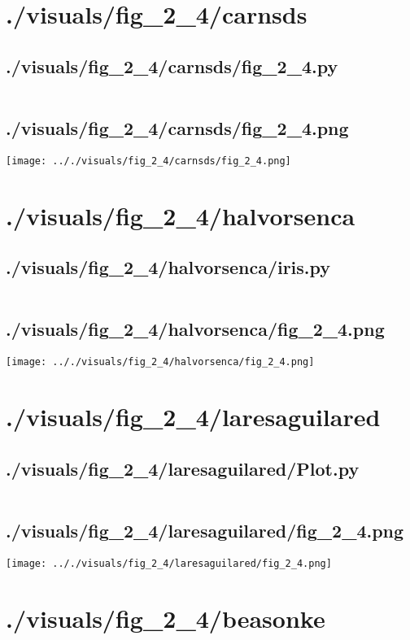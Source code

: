 \documentclass{report}
\begin{document}
    \section{./visuals/fig\_2\_4/carnsds}
    \subsection{./visuals/fig\_2\_4/carnsds/fig\_2\_4.py}
    \inputminted[breaklines=true]{python}{.././visuals/fig_2_4/carnsds/fig_2_4.py}
    \subsection{./visuals/fig\_2\_4/carnsds/fig\_2\_4.png}
    \texttt{[image: .././visuals/fig\_2\_4/carnsds/fig\_2\_4.png]}
    \pagebreak
    \section{./visuals/fig\_2\_4/halvorsenca}
    \subsection{./visuals/fig\_2\_4/halvorsenca/iris.py}
    \inputminted[breaklines=true]{python}{.././visuals/fig_2_4/halvorsenca/iris.py}
    \subsection{./visuals/fig\_2\_4/halvorsenca/fig\_2\_4.png}
    \texttt{[image: .././visuals/fig\_2\_4/halvorsenca/fig\_2\_4.png]}
    \pagebreak
    \section{./visuals/fig\_2\_4/laresaguilared}
    \subsection{./visuals/fig\_2\_4/laresaguilared/Plot.py}
    \inputminted[breaklines=true]{python}{.././visuals/fig_2_4/laresaguilared/Plot.py}
    \subsection{./visuals/fig\_2\_4/laresaguilared/fig\_2\_4.png}
    \texttt{[image: .././visuals/fig\_2\_4/laresaguilared/fig\_2\_4.png]}
    \pagebreak
    \section{./visuals/fig\_2\_4/beasonke}
\end{document}
